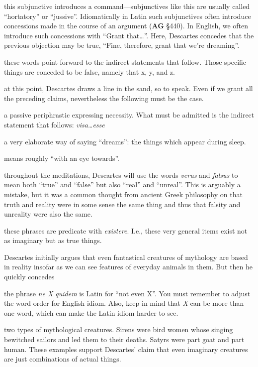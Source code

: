  this subjunctive introduces a command---subjunctives like this are usually called ``hortatory'' or ``jussive''. Idiomatically in Latin such subjunctives often introduce concessions made in the course of an argument (\textbf{AG} §440). In English, we often introduce such concessions with ``Grant that\dots''. Here, Descartes concedes that the previous objection may be true, ``Fine, therefore, grant that we're dreaming''.

 these words point forward to the indirect statements that follow. Those specific things are conceded to be false, namely that x, y, and z.

 at this point, Descartes draws a line in the sand, so to speak. Even if we grant all the preceding claims, nevertheless the following must be the case.

 a passive periphrastic expressing necessity. What must be admitted is the indirect statement that follows: \textit{visa\dots esse}

 a very elaborate way of saying ``dreams'': the things which appear during sleep.

 means roughly ``with an eye towards''.

 throughout the meditations, Descartes will use the words \textit{verus} and \textit{falsus} to mean both ``true'' and ``false'' but also ``real'' and ``unreal''. This is arguably a mistake, but it was a common thought from ancient Greek philosophy on that truth and reality were in some sense the same thing and thus that falsity and unreality were also the same.

 these phrases are predicate with \textit{existere}. I.e., these very general items exist not as imaginary but as true things.

 Descartes initially argues that even fantastical creatures of mythology are based in reality insofar as we can see features of everyday animals in them. But then he quickly concedes 

 the phrase \textit{ne X quidem} is Latin for ``not even X''. You must remember to adjust the word order for English idiom. Also, keep in mind that \textit{X} can be more than one word, which can make the Latin idiom harder to see.

 two types of mythological creatures. Sirens were bird women whose singing bewitched sailors and led them to their deaths. Satyrs were part goat and part human. These examples support Descartes' claim that even imaginary creatures are just combinations of actual things.

